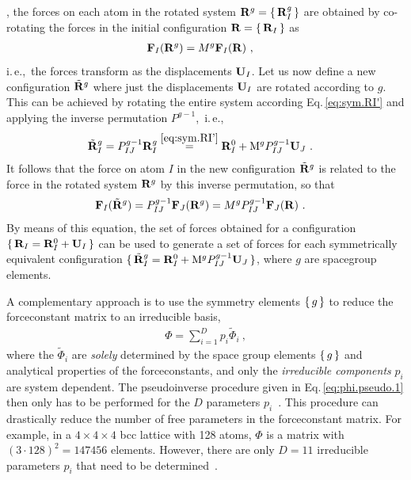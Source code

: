 , the forces on each atom in the rotated system ${\bf R}^g = \set{{\bf R}^g_I}$ are obtained by co-rotating the forces in the initial configuration ${\bf R} = \set{{\bf R}_I}$ as
\begin{align}
\b F_I (\b R^g) &= {M}^g \b F_I (\b R)~,
\label{eq:sym.Fp}
\end{align}
i.\,e.,~the forces transform as the displacements ${\bf U}_I$.
Let us now define a new configuration $\tilde{{\bf R}}^g$ where just the displacements ${\bf U}_I$ are rotated according to $g$. This can be achieved by rotating the entire system according Eq.\,\eqref{eq:sym.RI'} and applying the inverse permutation $P^{g-1}$,~i.\,e.,
\begin{align}
\tilde{{\bf R}}_I^g 
&= P^{g-1}_{IJ} {\bf R}_I^g 
\stackrel{\eqref{eq:sym.RI'}}{=} {\bf R}^0_I + {\rm M}^g P^{g-1}_{IJ} {\bf U}_J~.
\end{align}
It follows that the force on atom $I$ in the new configuration $\tilde{{\bf R}}^g$ is related to the force in the rotated system ${\bf R}^g$ by this inverse permutation, so that
\begin{align}
\b F_I (\tilde{\b R}^g) 
&= {P}^{g-1}_{IJ} \b F_J (\b R^g) 
= {M}^g  {P}^{g-1}_{IJ} \b F_J (\b R)~.
\label{eq:sym.Ftilde}
\end{align}
By means of this equation, the set of forces obtained for a configuration $\set{{\bf R}_I = {\bf R}_I^0 + {\bf U}_I}$ can be used to generate a set of forces for each symmetrically equivalent configuration $\set{\tilde{{\bf R}}_I^g = {\bf R}_I^0 + {\rm M}^g P^{g-1}_{IJ} {\bf U}_J}$, where $g$ are spacegroup elements.

A complementary approach is to use the symmetry elements $\set{g}$ to reduce the forceconstant matrix to an irreducible basis,
\begin{align}
\Phi 
= \sum_{i=1}^{D} p_i \tilde{\Phi}_i~,
\label{eq:sym.Phi.irrep.1}
\end{align}
where the $\tilde{\Phi}_i$ are \emph{solely} determined by the space group elements $\set{g}$ and analytical properties of the forceconstants, and only the \emph{irreducible components} $p_i$ are system dependent. The pseudoinverse procedure given in Eq.\,\eqref{eq:phi.pseudo.1} then only has to be performed for the $D$ parameters $p_i$~\cite{Parlinski.1997}. This procedure can drastically reduce the number of free parameters in the forceconstant matrix. For example, in a $4\times4\times4$ bcc lattice with 128 atoms, $\Phi$ is a matrix with $(3 \cdot 128)^2 = 147456$ elements. However, there are only $D=11$ irreducible parameters $p_i$ that need to be determined~\cite{Hellman.2013}.

